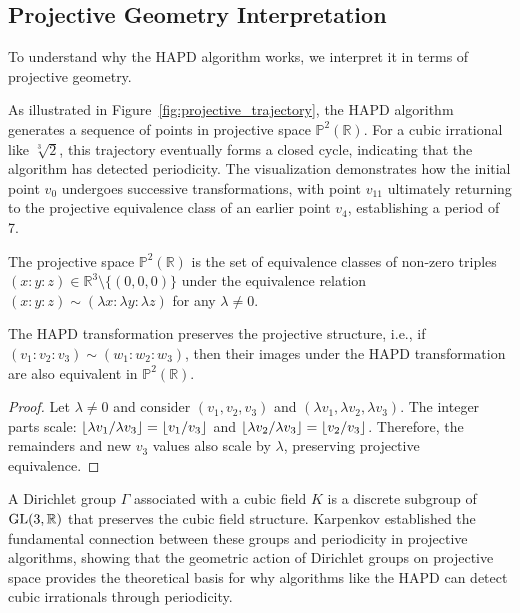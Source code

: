 \subsection{Projective Geometry Interpretation}

To understand why the HAPD algorithm works, we interpret it in terms of projective geometry.

As illustrated in Figure~\ref{fig:projective_trajectory}, the HAPD algorithm generates a sequence of points in projective space $\mathbb{P}^2(\mathbb{R})$. For a cubic irrational like $\sqrt[3]{2}$, this trajectory eventually forms a closed cycle, indicating that the algorithm has detected periodicity. The visualization demonstrates how the initial point $v_0$ undergoes successive transformations, with point $v_{11}$ ultimately returning to the projective equivalence class of an earlier point $v_4$, establishing a period of 7.

\begin{definition}
The projective space $\mathbb{P}^2(\mathbb{R})$ is the set of equivalence classes of non-zero triples $(x : y : z) \in \mathbb{R}^3 \setminus \{(0,0,0)\}$ under the equivalence relation $(x : y : z) \sim (\lambda x : \lambda y : \lambda z)$ for any $\lambda \neq 0$.
\end{definition}

\begin{proposition}\label{prop:projective_invariance}
The HAPD transformation preserves the projective structure, i.e., if $(v_1 : v_2 : v_3) \sim (w_1 : w_2 : w_3)$, then their images under the HAPD transformation are also equivalent in $\mathbb{P}^2(\mathbb{R})$.
\end{proposition}

\begin{proof}
Let $\lambda \neq 0$ and consider $(v_1, v_2, v_3)$ and $(\lambda v_1, \lambda v_2, \lambda v_3)$. The integer parts scale: $\lfloor \lambda v_1/\lambda v_3 \rfloor = \lfloor v_1/v_3 \rfloor$ and $\lfloor \lambda v_2/\lambda v_3 \rfloor = \lfloor v_2/v_3 \rfloor$. Therefore, the remainders and new $v_3$ values also scale by $\lambda$, preserving projective equivalence.
\end{proof}

\begin{definition}
A Dirichlet group $\Gamma$ associated with a cubic field $K$ is a discrete subgroup of $\operatorname{GL}(3,\mathbb{R})$ that preserves the cubic field structure. Karpenkov \cite{Karpenkov2022} established the fundamental connection between these groups and periodicity in projective algorithms, showing that the geometric action of Dirichlet groups on projective space provides the theoretical basis for why algorithms like the HAPD can detect cubic irrationals through periodicity.
\end{definition}

